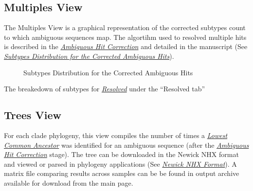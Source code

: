 \documentclass[letterpaper,10pt,english]{sphinxmanual}
\begin{document}
\subsection{Multiples View}
\label{Web:multiples-view}
The Multiples View is a graphical representation of the corrected subtypes
count to which ambiguous sequences map. The algortihm used to
resolved multiple hits is described in the {\hyperref[defs:multiple-hits]{\emph{Ambiguous Hit Correction}}} and
detailed in the manuscript (See {\hyperref[Web:multiplesview]{\emph{Subtypes Distribution for the Corrected Ambiguous Hits}}}).
\begin{figure}[htbp]
\centering
\capstart

\caption{Subtypes Distribution for the Corrected Ambiguous Hits}\label{Web:multiplesview}\end{figure}

The breakedown of subtypes for {\hyperref[defs:resolved]{\emph{Resolved}}} under the ``Resolved tab''


\subsection{Trees View}
\label{Web:trees-view}
For each clade phylogeny, this view compiles the number of times a {\hyperref[defs:lca]{\emph{Lowest Common Ancestor}}}
was identified for an ambiguous sequence (after the {\hyperref[defs:multiple-hits]{\emph{Ambiguous Hit Correction}}} stage).
The tree can be downloaded in the Newick NHX format and viewed or parsed in phylogeny
applications (See {\hyperref[defs:newick]{\emph{Newick NHX Format}}}). A matrix file comparing results across samples can be be found in
output archive available for download from the main page.
\end{document}
